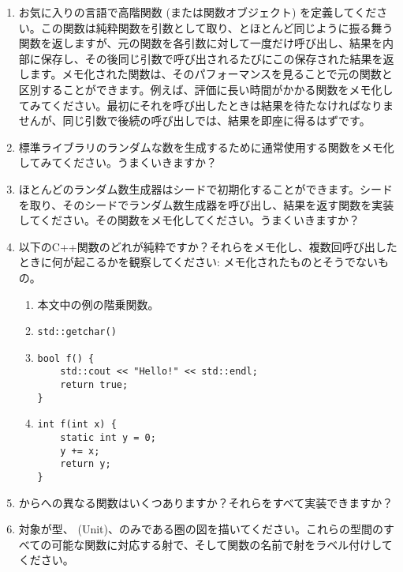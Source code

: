 \begin{enumerate}
  \tightlist
  \item
        お気に入りの言語で高階関数 (または関数オブジェクト) を定義してください。この関数は純粋関数を引数として取り、とほとんど同じように振る舞う関数を返しますが、元の関数を各引数に対して一度だけ呼び出し、結果を内部に保存し、その後同じ引数で呼び出されるたびにこの保存された結果を返します。メモ化された関数は、そのパフォーマンスを見ることで元の関数と区別することができます。例えば、評価に長い時間がかかる関数をメモ化してみてください。最初にそれを呼び出したときは結果を待たなければなりませんが、同じ引数で後続の呼び出しでは、結果を即座に得るはずです。
  \item
        標準ライブラリのランダムな数を生成するために通常使用する関数をメモ化してみてください。うまくいきますか？
  \item
        ほとんどのランダム数生成器はシードで初期化することができます。シードを取り、そのシードでランダム数生成器を呼び出し、結果を返す関数を実装してください。その関数をメモ化してください。うまくいきますか？
  \item
        以下のC++関数のどれが純粋ですか？それらをメモ化し、複数回呼び出したときに何が起こるかを観察してください: メモ化されたものとそうでないもの。

        \begin{enumerate}
          \tightlist
          \item
                本文中の例の階乗関数。
          \item
                \begin{verbatim}
std::getchar()
\end{verbatim}
          \item
                \begin{verbatim}
bool f() {
    std::cout << "Hello!" << std::endl;
    return true;
}
\end{verbatim}
          \item
                \begin{verbatim}
int f(int x) {
    static int y = 0;
    y += x;
    return y;
}
\end{verbatim}
        \end{enumerate}
  \item
        からへの異なる関数はいくつありますか？それらをすべて実装できますか？
  \item
        対象が型、\code{()} (Unit)、のみである圏の図を描いてください。これらの型間のすべての可能な関数に対応する射で、そして関数の名前で射をラベル付けしてください。
\end{enumerate}
